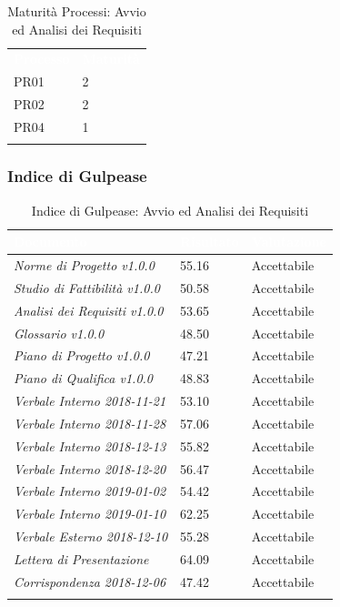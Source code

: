 \begin{longtable}{|C{.47\textwidth}|C{.47\textwidth}|}
\hline
{}\textbf{\textcolor{white}{Processo}} & \textbf{\textcolor{white}{Maturità}}\\
PR01 & 2\\ 
\hline
{}PR02 & 2 \\
\hline
PR04 & 1 \\ 
\hline 
\caption{Maturità Processi: Avvio ed Analisi dei Requisiti}
\label{mat:aar}
\end{longtable}


\subsubsection{Indice di Gulpease}


\begin{longtable}{|C{.47\textwidth}|C{.22\textwidth}|C{.22\textwidth}|}
\hline
{}\textbf{\textcolor{white}{Documento}} & \textbf{\textcolor{white}{Risultato}} & \textbf{\textcolor{white}{Valutazione}}\\
\endhead
\textit{Norme di Progetto v1.0.0} & 55.16 & Accettabile \\
\hline
{}\textit{Studio di Fattibilità v1.0.0} & 50.58 & Accettabile\\
\hline
\textit{Analisi dei Requisiti v1.0.0} & 53.65 & Accettabile \\
\hline
{}\textit{Glossario v1.0.0} & 48.50 & Accettabile\\
\hline
\textit{Piano di Progetto v1.0.0} & 47.21 & Accettabile \\
\hline
{}\textit{Piano di Qualifica v1.0.0} & 48.83 & Accettabile\\

\hline
\textit{Verbale Interno 2018-11-21} & 53.10 & Accettabile\\
\hline
{}\textit{Verbale Interno 2018-11-28} & 57.06 & Accettabile\\
\hline
\textit{Verbale Interno 2018-12-13} & 55.82 & Accettabile\\
\hline
{}\textit{Verbale Interno 2018-12-20} & 56.47 & Accettabile \\
\hline
\textit{Verbale Interno 2019-01-02} & 54.42 & Accettabile \\
\hline
{}\textit{Verbale Interno 2019-01-10} & 62.25 & Accettabile\\
\hline
\textit{Verbale Esterno 2018-12-10} & 55.28 & Accettabile\\
\hline
{}\textit{Lettera di Presentazione} & 64.09 & Accettabile\\
\hline
\textit{Corrispondenza 2018-12-06} & 47.42 & Accettabile\\
\hline

\caption{Indice di Gulpease: Avvio ed Analisi dei Requisiti}
\label{gulp:aar}
\end{longtable}






